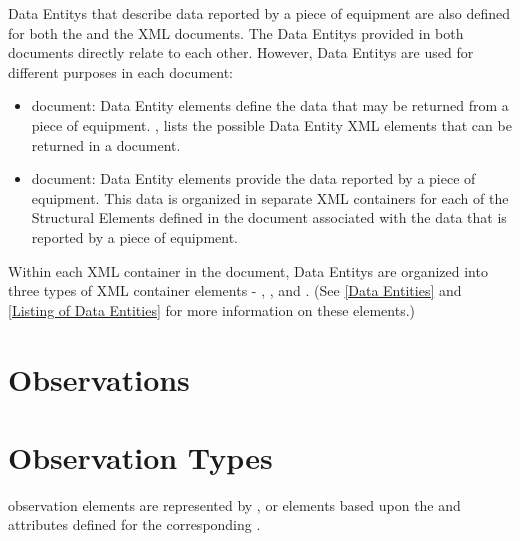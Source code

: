 \glspl{Data Entity} that describe data reported by a piece of equipment are also defined for both the  and the  \gls{XML} documents.  The \glspl{Data Entity} provided in both documents directly relate to each other.  However, \glspl{Data Entity} are used for different purposes in each document:

\begin{itemize}
\item {} document: \gls{Data Entity} elements define the data that may be returned from a piece of equipment.  , \cite{Sections 7 and 8} lists the possible \gls{Data Entity} \gls{XML} elements that can be returned in a  document.  

\item {} document: \gls{Data Entity} elements provide the data reported by a piece of equipment.  This data is organized in separate  \gls{XML} containers for each of the \glspl{Structural Element} defined in the  document associated with the data that is reported by a piece of equipment.  
\end{itemize}

Within each  \gls{XML} container in the  document, \glspl{Data Entity} are organized into three types of \gls{XML} container elements - , , and .  (See \ref{Data Entities} and \ref{Listing of Data Entities} for more information on these elements.)


\section{Observations}
\label{sec:Observations}







\section{Observation Types}
\label{sec:Observation Types}

\gls{observation} elements are represented by ,  or  elements based upon the  and  attributes defined for the corresponding .






